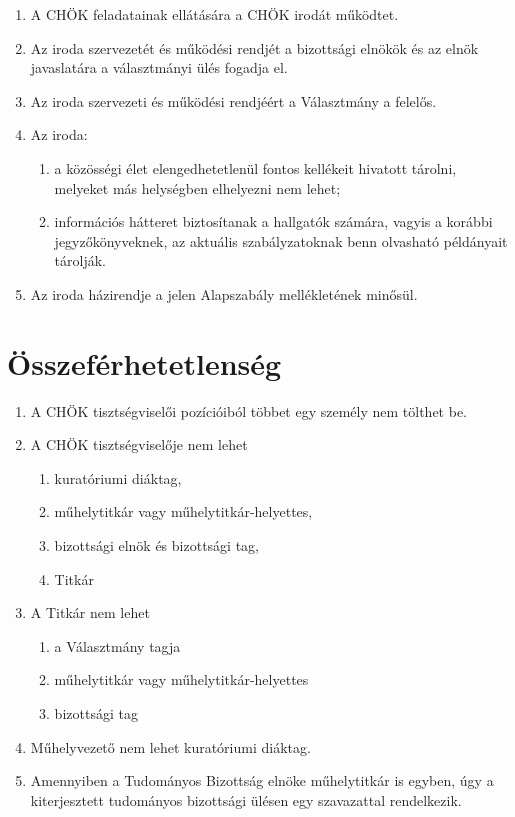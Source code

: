 \documentclass{../styles/rulebook}
\begin{document}
\begin{enumerate}
	\item A CHÖK feladatainak ellátására a CHÖK irodát működtet.
	\item Az iroda szervezetét és működési rendjét a bizottsági elnökök és az elnök javaslatára a választmányi ülés fogadja el.
	\item Az iroda szervezeti és működési rendjéért a Választmány a felelős.
	\item Az iroda:
	\begin{enumerate}
		\item a közösségi élet elengedhetetlenül fontos kellékeit hivatott tárolni, melyeket más helységben elhelyezni nem lehet;
		\item információs hátteret biztosítanak a hallgatók számára, vagyis a korábbi jegyzőkönyveknek, az aktuális szabályzatoknak benn olvasható példányait tárolják.
	\end{enumerate}
	\item Az iroda házirendje a jelen Alapszabály mellékletének minősül.
\end{enumerate}

\section{Összeférhetetlenség}

\begin{enumerate}
	\item A CHÖK tisztségviselői pozícióiból többet egy személy nem tölthet be.
	\item A CHÖK tisztségviselője nem lehet
	\begin{enumerate}
		\item kuratóriumi diáktag,
		\item műhelytitkár vagy műhelytitkár-helyettes,
		\item bizottsági elnök és bizottsági tag,
		\item Titkár
	\end{enumerate}
	\item A Titkár nem lehet
	\begin{enumerate}
		\item a Választmány tagja
		\item műhelytitkár vagy műhelytitkár-helyettes
		\item bizottsági tag
	\end{enumerate}
	\item Műhelyvezető nem lehet kuratóriumi diáktag.
	\item Amennyiben a Tudományos Bizottság elnöke műhelytitkár is egyben, úgy a kiterjesztett tudományos bizottsági ülésen egy szavazattal rendelkezik.
\end{enumerate}
\end{document}
